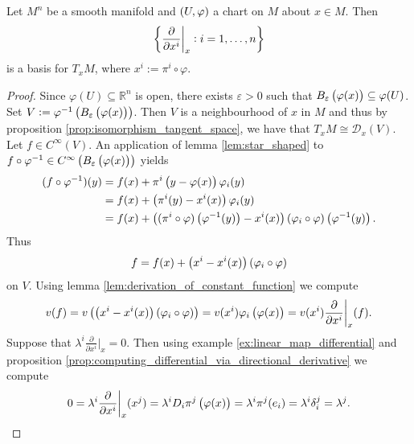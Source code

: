 \begin{proposition}
	Let $M^n$ be a smooth manifold and $\del[0]{U,\varphi}$ a chart on $M$ about $x \in M$. Then 
	\begin{equation*}
		\cbr[3]{\frac{\partial}{\partial x^i}\bigg\vert_x : i = 1,\dots,n}
	\end{equation*}
	\noindent is a basis for $T_xM$, where $x^i := \pi^i \circ \varphi$.
\end{proposition}

\begin{proof}
	Since $\varphi(U) \subseteq \mathbb{R}^n$ is open, there exists $\varepsilon > 0$ such that $B_\varepsilon\del[1]{\varphi(x)} \subseteq \varphi(U)$. Set $V := \varphi^{-1}\del[1]{B_\varepsilon\del[1]{\varphi(x)}}$. Then $V$ is a neighbourhood of $x$ in $M$ and thus by proposition \ref{prop:isomorphism_tangent_space}, we have that $T_xM \cong \mathcal{D}_x(V)$. Let $f \in C^\infty(V)$. An application of lemma \ref{lem:star_shaped} to $f \circ \varphi^{-1} \in C^\infty\del[1]{B_\varepsilon\del[1]{\varphi(x)}}$ yields
	\begin{align*}
		(f \circ \varphi^{-1})(y) &= f(x) + \pi^i\del[1]{y - \varphi(x)}\varphi_i(y)\\
		&= f(x) + \del[1]{\pi^i(y) - x^i(x)}\varphi_i(y)\\
		&= f(x) + \del[1]{(\pi^i \circ \varphi)\del[1]{\varphi^{-1}(y)} - x^i(x)}(\varphi_i \circ \varphi)\del[1]{\varphi^{-1}(y)}.\\
	\end{align*}
	Thus 
	\begin{equation*}
		f = f(x) + \del[1]{x^i - x^i(x)}(\varphi_i \circ \varphi) 
	\end{equation*}
	\noindent on $V$. Using lemma \ref{lem:derivation_of_constant_function} we compute
	\begin{equation}
		\label{eq:derivation_in_coordinates}
		v(f) = v\del[1]{\del[1]{x^i - x^i(x)}(\varphi_i \circ \varphi)} = v(x^i)\varphi_i\del[1]{\varphi(x)} = v(x^i)\frac{\partial}{\partial x^i}\bigg\vert_x(f).
	\end{equation}
	Suppose that $\lambda^i\frac{\partial}{\partial x^i}\big\vert_x = 0$. Then using example \ref{ex:linear_map_differential} and proposition \ref{prop:computing_differential_via_directional_derivative} we compute
	\begin{equation*}
		0 = \lambda^i\frac{\partial}{\partial x^i}\bigg\vert_x(x^j) = \lambda^i D_i\pi^j\del[1]{\varphi(x)} = \lambda^i \pi^j(e_i) = \lambda^i \delta^j_i = \lambda^j.
	\end{equation*}
\end{proof}

